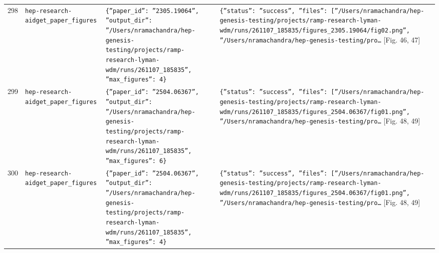 \documentclass[11pt,a4paper]{article}
\begin{document}
\begin{longtable}{@{}p{}p{}p{}p{}@{}}
298 & \texttt{hep-research-aid}\newline\texttt{get\_\allowbreak{}paper\_\allowbreak{}figures} & \texttt{\{''paper\_\allowbreak{}id'':\allowbreak{} ''2305.19064'',\allowbreak{} ''output\_\allowbreak{}dir'':\allowbreak{} ''/\allowbreak{}Users/\allowbreak{}nramachandra/\allowbreak{}hep-genesis-testing/\allowbreak{}projects/\allowbreak{}ramp-research-lyman-wdm/\allowbreak{}runs/\allowbreak{}261107\_\allowbreak{}185835'',\allowbreak{} ''max\_\allowbreak{}figures'':\allowbreak{} 4\}\allowbreak{}} & \texttt{\{''status'':\allowbreak{} ''success'',\allowbreak{} ''files'':\allowbreak{} [''/\allowbreak{}Users/\allowbreak{}nramachandra/\allowbreak{}hep-genesis-testing/\allowbreak{}projects/\allowbreak{}ramp-research-lyman-wdm/\allowbreak{}runs/\allowbreak{}261107\_\allowbreak{}185835/\allowbreak{}figures\_\allowbreak{}2305.19064/\allowbreak{}fig02.png'',\allowbreak{} ''/\allowbreak{}Users/\allowbreak{}nramachandra/\allowbreak{}hep-genesis-testing/\allowbreak{}pro\ldots{}\allowbreak{}} [Fig. 46, 47] \\
299 & \texttt{hep-research-aid}\newline\texttt{get\_\allowbreak{}paper\_\allowbreak{}figures} & \texttt{\{''paper\_\allowbreak{}id'':\allowbreak{} ''2504.06367'',\allowbreak{} ''output\_\allowbreak{}dir'':\allowbreak{} ''/\allowbreak{}Users/\allowbreak{}nramachandra/\allowbreak{}hep-genesis-testing/\allowbreak{}projects/\allowbreak{}ramp-research-lyman-wdm/\allowbreak{}runs/\allowbreak{}261107\_\allowbreak{}185835'',\allowbreak{} ''max\_\allowbreak{}figures'':\allowbreak{} 6\}\allowbreak{}} & \texttt{\{''status'':\allowbreak{} ''success'',\allowbreak{} ''files'':\allowbreak{} [''/\allowbreak{}Users/\allowbreak{}nramachandra/\allowbreak{}hep-genesis-testing/\allowbreak{}projects/\allowbreak{}ramp-research-lyman-wdm/\allowbreak{}runs/\allowbreak{}261107\_\allowbreak{}185835/\allowbreak{}figures\_\allowbreak{}2504.06367/\allowbreak{}fig01.png'',\allowbreak{} ''/\allowbreak{}Users/\allowbreak{}nramachandra/\allowbreak{}hep-genesis-testing/\allowbreak{}pro\ldots{}\allowbreak{}} [Fig. 48, 49] \\
300 & \texttt{hep-research-aid}\newline\texttt{get\_\allowbreak{}paper\_\allowbreak{}figures} & \texttt{\{''paper\_\allowbreak{}id'':\allowbreak{} ''2504.06367'',\allowbreak{} ''output\_\allowbreak{}dir'':\allowbreak{} ''/\allowbreak{}Users/\allowbreak{}nramachandra/\allowbreak{}hep-genesis-testing/\allowbreak{}projects/\allowbreak{}ramp-research-lyman-wdm/\allowbreak{}runs/\allowbreak{}261107\_\allowbreak{}185835'',\allowbreak{} ''max\_\allowbreak{}figures'':\allowbreak{} 4\}\allowbreak{}} & \texttt{\{''status'':\allowbreak{} ''success'',\allowbreak{} ''files'':\allowbreak{} [''/\allowbreak{}Users/\allowbreak{}nramachandra/\allowbreak{}hep-genesis-testing/\allowbreak{}projects/\allowbreak{}ramp-research-lyman-wdm/\allowbreak{}runs/\allowbreak{}261107\_\allowbreak{}185835/\allowbreak{}figures\_\allowbreak{}2504.06367/\allowbreak{}fig01.png'',\allowbreak{} ''/\allowbreak{}Users/\allowbreak{}nramachandra/\allowbreak{}hep-genesis-testing/\allowbreak{}pro\ldots{}\allowbreak{}} [Fig. 48, 49] \\

\end{longtable}
\end{document}
